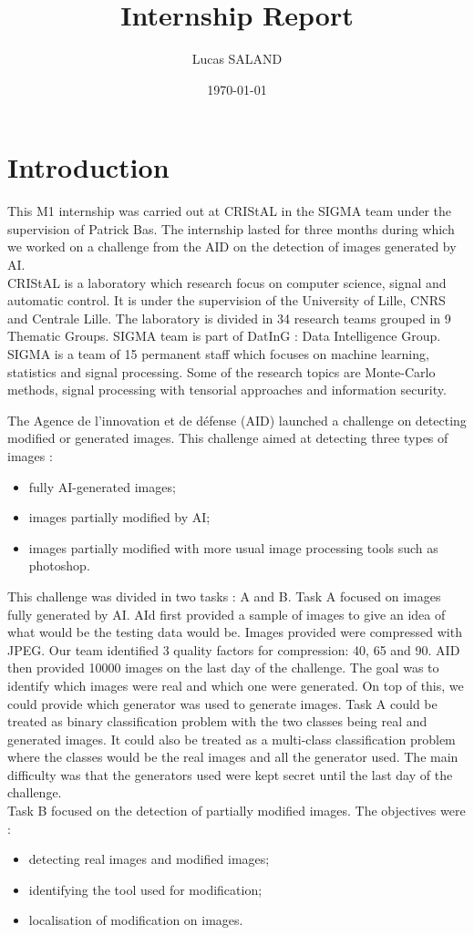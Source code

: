 \documentclass[12pt,a4paper]{article}
\title{Internship Report}
\author{Lucas SALAND}
\date{\today}
\begin{document}
\maketitle
\newpage
\tableofcontents
\newpage

\section*{Introduction}
This M1 internship was carried out at CRIStAL in the SIGMA team under the supervision of Patrick Bas. The internship lasted for three months during which we worked on a challenge from the AID on the detection of images generated by AI.\\
CRIStAL is a laboratory which research focus on computer science, signal and automatic control. It is under the supervision of the University of Lille, CNRS and Centrale Lille. The laboratory is divided in 34 research teams grouped in 9 Thematic Groups. SIGMA team is part of DatInG : Data Intelligence Group. SIGMA is a team of 15 permanent staff which focuses on machine learning, statistics and signal processing. Some of the research topics are Monte-Carlo methods, signal processing with tensorial approaches and information security.

The Agence de l'innovation et de défense (AID) launched a challenge on detecting modified or generated images. This challenge aimed at detecting three types of images :
\begin{itemize}
    \item fully AI-generated images;
    \item images partially modified by AI;
    \item images partially modified with more usual image processing tools such as photoshop.
\end{itemize}
This challenge was divided in two tasks : A and B. Task A focused on images fully generated by AI. AId first provided a sample of images to give an idea of what would be the testing data would be. Images provided were compressed with JPEG. Our team identified 3 quality factors for compression: 40, 65 and 90. AID then provided 10000 images on the last day of the challenge. The goal was to identify which images were real and which one were generated. On top of this, we could provide which generator was used to generate images. Task A could be treated as binary classification problem with the two classes being real and generated images. It could also be treated as a multi-class classification problem where the classes would be the real images and all the generator used. The main difficulty was that the generators used were kept secret until the last day of the challenge.\\
Task B focused on the detection of partially modified images. The objectives were :
\begin{itemize}
    \item detecting real images and modified images;
    \item identifying the tool used for modification;
    \item localisation of modification on images.
\end{itemize}
\end{document}
